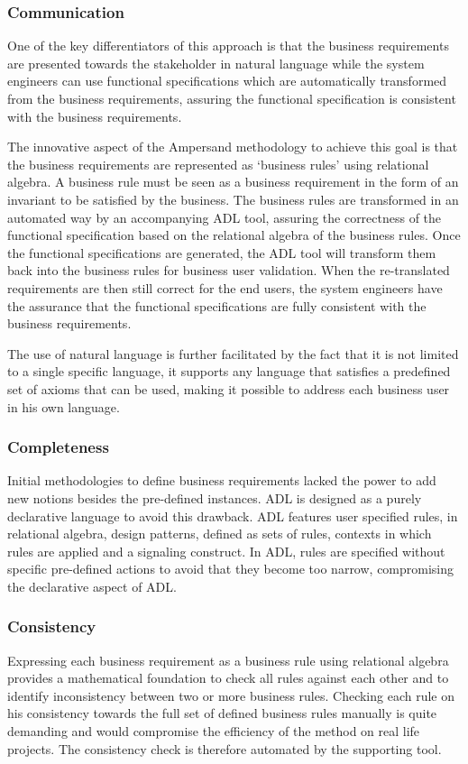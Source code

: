 \subsubsection{Communication}

One of the key differentiators of this approach is that the business requirements are presented towards the stakeholder in natural language while the system engineers can use functional specifications which are automatically transformed from the business requirements, assuring the functional specification is consistent with the business requirements.

The innovative aspect of the Ampersand methodology to achieve this goal is that the business requirements are  represented as `business rules' using relational algebra. A business rule must be seen as a business requirement in the form of an invariant to be satisfied by the business. The business rules are transformed in an automated way by an accompanying ADL tool, assuring the correctness of the functional specification based on the relational algebra of the business rules. Once the functional specifications are generated, the ADL tool will transform them back into the business rules for business user validation. When the re-translated requirements are then still correct for the end users, the system engineers have the assurance that the functional specifications are fully consistent with the business requirements. 

The use of natural language is further facilitated by the fact that it is not limited to a single specific language, it supports any language that satisfies a predefined set of axioms that can be used, making it possible to address each business user in his own language.

\subsubsection{Completeness}
Initial methodologies to define business requirements lacked the power to add new notions besides the pre-defined instances. ADL is designed as a purely declarative language to avoid this drawback. ADL features user specified rules, in relational algebra, design patterns, defined as sets of rules, contexts in which rules are applied and a signaling construct. In ADL, rules are specified without specific pre-defined actions to avoid that they become too narrow, compromising the declarative aspect of ADL.

\subsubsection{Consistency}
Expressing each business requirement as a business rule using relational algebra provides a mathematical foundation to check all rules against each other and to identify inconsistency between two or more business rules.  Checking each rule on his consistency towards the full set of defined business rules manually is quite demanding and would compromise the efficiency of the method on real life projects. 
The consistency check is therefore automated by the supporting tool.

